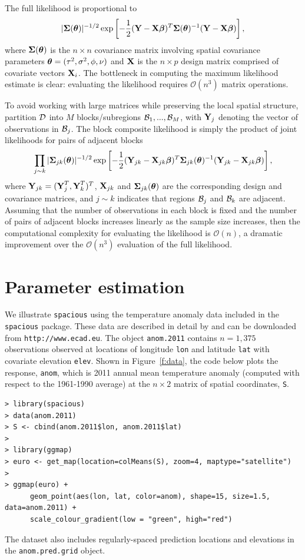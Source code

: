 \documentclass[11pt]{article}
\newcommand{\btheta}{ \mbox{\boldmath $\theta$}}
\newcommand{\bbeta}{ \mbox{\boldmath $\beta$}}
\newcommand{\bSigma}{ \mbox{\boldmath $\Sigma$}}
\newcommand{\bX}{ \mbox{\bf X}}
\newcommand{\bY}{ \mbox{\bf Y}}
\newcommand{\calD}{{\cal D}}
\newcommand{\calB}{{\cal B}}
\begin{document}
The full likelihood is proportional to
$$ |\bSigma(\btheta)|^{-1/2}\exp\left[-\frac{1}{2}(\bY-\bX\bbeta)^T\bSigma(\btheta)^{-1}(\bY-\bX\bbeta)\right],$$
where $\bSigma(\btheta)$ is the $n\times n$ covariance matrix involving spatial covariance parameters $\btheta = (\tau^2,\sigma^2,\phi,\nu)$ and $\bX$ is the $n\times p$ design matrix comprised of covariate vectors $\bX_i$.
The bottleneck in computing the maximum likelihood estimate is clear: evaluating the likelihood requires $\mathcal{O}(n^3)$ matrix operations.

To avoid working with large matrices while preserving the local spatial structure, \cite{Eidsvik:2013} partition $\calD$ into $M$ blocks/subregions $\calB_1,...,\calB_M$, with $\bY_j$ denoting the vector of observations in $\calB_j$.
The block composite likelihood is simply the product of joint likelihoods for pairs of adjacent blocks
$$ \prod_{j\sim k}
    |\bSigma_{jk}(\btheta)|^{-1/2}\exp\left[-\frac{1}{2}(\bY_{jk}-\bX_{jk}\bbeta)^T\bSigma_{jk}(\btheta)^{-1}(\bY_{jk}-\bX_{jk}\bbeta)\right],$$
where $\bY_{jk} = (\bY_j^T, \bY_k^T)^T$, $\bX_{jk}$ and $\bSigma_{jk}(\btheta)$ are the corresponding design and covariance matrices, and $j\sim k$ indicates that regions $\calB_j$ and $\calB_k$ are adjacent.
Assuming that the number of observations in each block is fixed and the number of pairs of adjacent blocks increases linearly as the sample size increases, then the computational complexity for evaluating the likelihood is $\mathcal{O}(n)$, a dramatic improvement over the $\mathcal{O}(n^3)$ evaluation of the full likelihood.

\section{Parameter estimation}\label{s:estimate}

We illustrate {\tt spacious} using the temperature anomaly data included in the {\tt spacious} package.
These data are described in detail by \cite{klein-2002a} and can be downloaded from {\tt http://www.ecad.eu}.
The object {\tt anom.2011} contains $n=1,375$ observations observed at locations of longitude {\tt lon} and latitude {\tt lat} with covariate elevation {\tt elev}.
Shown in Figure~\ref{f:data}, the code below plots the response, {\tt anom}, which is 2011 annual mean temperature anomaly (computed with respect to the 1961-1990 average) at the $n\times 2$ matrix of spatial coordinates, {\tt S}.

\begin{verbatim}
> library(spacious)
> data(anom.2011)
> S <- cbind(anom.2011$lon, anom.2011$lat)
>
> library(ggmap)
> euro <- get_map(location=colMeans(S), zoom=4, maptype="satellite")
> 
> ggmap(euro) +
      geom_point(aes(lon, lat, color=anom), shape=15, size=1.5, data=anom.2011) +
      scale_colour_gradient(low = "green", high="red")
\end{verbatim}
The dataset also includes regularly-spaced prediction locations and elevations in the {\tt anom.pred.grid} object.
\end{document}
